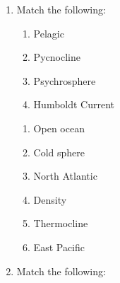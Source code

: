 \documentclass[12pt,fleqn]{article}
\theoremstyle{remark}
\begin{document}
\begin{enumerate}[label=Q.\arabic*.]
    \item Match the following: \hfill{} \\
    
\begin{multicols}{2}
            \begin{enumerate}[label=(\Alph*),start=16]
                \item Pelagic
                \item Pycnocline
                \item Psychrosphere
                \item Humboldt Current
            \end{enumerate}
            
            \columnbreak
            
            

            \begin{enumerate}[label=\arabic*.]
                \item Open ocean
                \item Cold sphere
                \item North Atlantic
                \item Density
                \item Thermocline
                \item East Pacific
            \end{enumerate}            

        \end{multicols}
            \begin {enumerate}
            \end{enumerate}
\item Match the following: \hfill{} \\
    

\end{enumerate}
\end{document}
